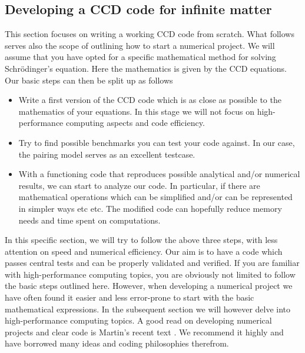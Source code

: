 \subsection{Developing a CCD code for infinite matter\label{sec:ccdcode}}
  This section focuses on writing a working CCD code from
  scratch. What follows serves also the scope of outlining how to start a numerical project.  We will assume that you have 
opted for a specific mathematical method for solving Schr\"odinger's equation. Here the mathematics is  given by the CCD equations.  
Our basic steps can then be split up as follows 
  \begin{itemize}
\item Write a first version of the CCD  code which is as close as possible to the mathematics of your equations. In this stage we will not 
focus on high-performance computing aspects and code efficiency.
\item Try to find possible benchmarks you can test your code against. In our case, the pairing model serves as an excellent testcase. 
\item With a functioning code that reproduces possible analytical and/or numerical results, we can start to analyze our code. In particular, if there are mathematical operations which can be simplified and/or can be represented in simpler ways etc etc. The modified code can hopefully reduce memory needs and time spent on computations.
\end{itemize}
In this specific section, we will try to follow the above three steps,
with less attention on speed and numerical efficiency.  Our aim is to
have a code which passes central tests and can be properly validated
and verified.  If you are familiar with high-performance computing
topics, you are obviously not limited to follow the basic steps
outlined here.  However, when developing a numerical project we have
often found it easier and less error-prone to start with the basic
mathematical expressions. In the subsequent section we will however
delve into high-performance computing topics. A good read on developing numerical projects and clear code is Martin's recent text \cite{martin2015}.
We recommend it highly and have borrowed many ideas and coding philosophies therefrom. 

